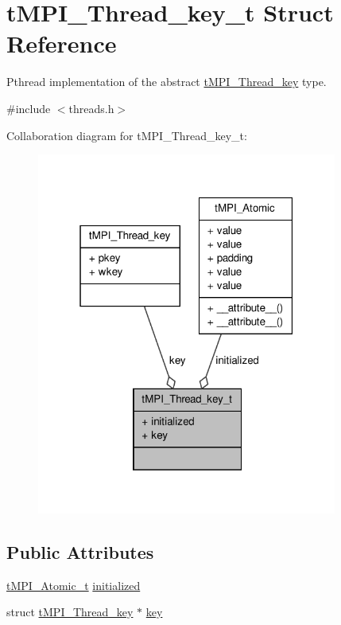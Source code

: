 \hypertarget{structtMPI__Thread__key__t}{\section{t\-M\-P\-I\-\_\-\-Thread\-\_\-key\-\_\-t \-Struct \-Reference}
\label{structtMPI__Thread__key__t}
}


\-Pthread implementation of the abstract \hyperlink{structtMPI__Thread__key}{t\-M\-P\-I\-\_\-\-Thread\-\_\-key} type.  




{\ttfamily \#include $<$threads.\-h$>$}



\-Collaboration diagram for t\-M\-P\-I\-\_\-\-Thread\-\_\-key\-\_\-t\-:
\nopagebreak
\begin{figure}[H]
\begin{center}
\leavevmode
\includegraphics[width=280pt]{structtMPI__Thread__key__t__coll__graph}
\end{center}
\end{figure}
\subsection*{\-Public \-Attributes}
\begin{DoxyCompactItemize}
\item 
\hyperlink{include_2thread__mpi_2atomic_2gcc_8h_a2c33794dc540e3b07cffc1f81a3fe4b4}{t\-M\-P\-I\-\_\-\-Atomic\-\_\-t} \hyperlink{structtMPI__Thread__key__t_a2f82d35de67d93bafa2f1aac13865c57}{initialized}
\item 
struct \hyperlink{structtMPI__Thread__key}{t\-M\-P\-I\-\_\-\-Thread\-\_\-key} $\ast$ \hyperlink{structtMPI__Thread__key__t_a857a08ccbdce2b298a2e7abc2b7577b5}{key}
\end{DoxyCompactItemize}


